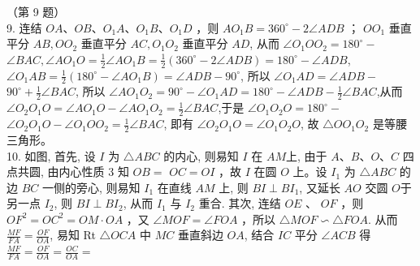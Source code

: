 \documentclass[10pt]{article}
\begin{document}
（第 9 题）\\
9. 连结 $O A 、 O B 、 O_{1} A 、 O_{1} B 、 O_{1} D$ ，则 $A O_{1} B=360^{\circ}-2 \angle A D B$ ； $O O_{1}$ 垂直平分 $A B, O O_{2}$ 垂直平分 $A C, O_{1} O_{2}$ 垂直平分 $A D$, 从而 $\angle O_{1} O O_{2}=180^{\circ}-$ $\angle B A C, \angle A O_{1} O=\frac{1}{2} \angle A O_{1} B=\frac{1}{2}\left(360^{\circ}-2 \angle A D B\right)=180^{\circ}-\angle A D B$, $\angle O_{1} A B=\frac{1}{2}\left(180^{\circ}-\angle A O_{1} B\right)=\angle A D B-90^{\circ}$, 所以 $\angle O_{1} A D=\angle A D B-$ $90^{\circ}+\frac{1}{2} \angle B A C$, 所以 $\angle A O_{1} O_{2}=90^{\circ}-\angle O_{1} A D=180^{\circ}-\angle A D B-\frac{1}{2} \angle B A C$,从而 $\angle O_{2} O_{1} O=\angle A O_{1} O-\angle A O_{1} O_{2}=\frac{1}{2} \angle B A C$,于是 $\angle O_{1} O_{2} O=180^{\circ}-$\\
$\angle O_{2} O_{1} O-\angle O_{1} O O_{2}=\frac{1}{2} \angle B A C$, 即有 $\angle O_{2} O_{1} O=\angle O_{1} O_{2} O$, 故 $\triangle O O_{1} O_{2}$ 是等腰三角形。\\
10. 如图, 首先, 设 $I$ 为 $\triangle A B C$ 的内心, 则易知 $I$ 在 $A M$上, 由于 $A 、 B 、 O 、 C$ 四点共圆, 由内心性质 3 知 $O B=$ $O C=O I$ ，故 $I$ 在圆 $O$ 上。设 $I_{1}$ 为 $\triangle A B C$ 的边 $B C$ 一侧的旁心, 则易知 $I_{1}$ 在直线 $A M$ 上, 则 $B I \perp B I_{1}$, 又延长 $A O$ 交圆 $O$于另一点 $I_{2}$, 则 $B I \perp B I_{2}$, 从而 $I_{1}$ 与 $I_{2}$ 重合. 其次, 连结 $O E$ 、 $O F$ ，则 $O F^{2}=O C^{2}=O M \cdot O A$ ，又 $\angle M O F=\angle F O A$ ，所以 $\triangle M O F \backsim \triangle F O A$. 从而 $\frac{M F}{F A}=\frac{O F}{O A}$, 易知 Rt $\triangle O C A$ 中 $M C$ 垂直斜边 $O A$, 结合 $I C$ 平分 $\angle A C B$ 得 $\frac{M F}{F A}=\frac{O F}{O A}=\frac{O C}{O A}=$\\
\end{document}
